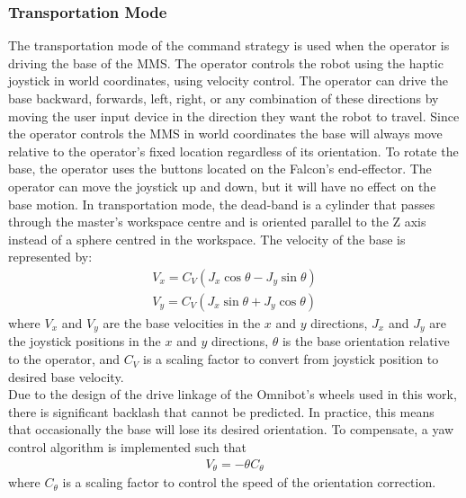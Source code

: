 \documentclass[onecolumn,10pt,final]{asme2ej}
\begin{document}
\subsubsection{Transportation Mode}

The transportation mode of the command strategy is used when the operator is driving the base of the MMS. The operator controls the robot using the haptic joystick in world coordinates, using velocity control. The operator can drive the base backward, forwards, left, right, or any combination of these directions by moving the user input device in the direction they want the robot to travel. Since the operator controls the MMS in world coordinates the base will always move relative to the operator's fixed location regardless of its orientation. To rotate the base, the operator uses the buttons located on the Falcon's end-effector. The operator can move the joystick up and down, but it will have no effect on the base motion. In transportation mode, the dead-band is a cylinder that passes through the master's workspace centre and is oriented parallel to the Z axis instead of a sphere centred in the workspace. The velocity of the base is represented by: 
\begin{align}
V_x = C_V\left(J_x\cos\theta - J_y\sin\theta\right)\\
V_y = C_V\left(J_x\sin\theta + J_y\cos\theta\right)
\end{align} 
where $V_x$ and $V_y$ are the base velocities in the $x$ and $y$ directions, $J_x$ and $J_y$ are the joystick positions in the $x$ and $y$ directions, $\theta$ is the base orientation relative to the operator, and $C_V$ is a scaling factor to convert from joystick position to desired base velocity.\\

Due to the design of the drive linkage of the Omnibot's wheels used in this work, there is significant backlash that cannot be predicted. In practice, this means that occasionally the base will lose its desired orientation. To compensate, a yaw control algorithm is implemented such that 
\begin{align}
V_{\theta} = -\theta C_{\theta}
\end{align}
where $C_{\theta}$ is a scaling factor to control the speed of the orientation correction.\\
\end{document}
